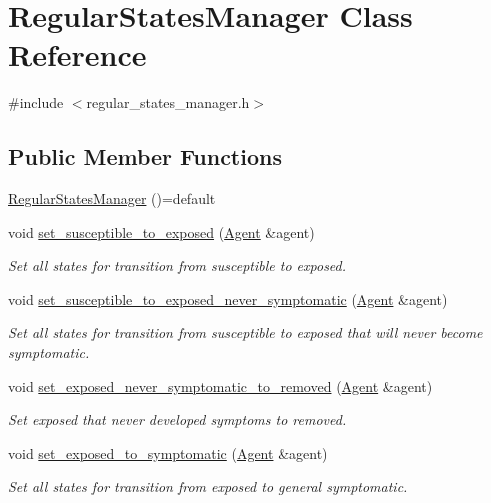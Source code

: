 \hypertarget{classRegularStatesManager}{}\section{Regular\+States\+Manager Class Reference}
\label{classRegularStatesManager}


{\ttfamily \#include $<$regular\+\_\+states\+\_\+manager.\+h$>$}

\subsection*{Public Member Functions}
\begin{DoxyCompactItemize}
\item 
\hyperlink{classRegularStatesManager_a05c6533bf5e460afef3e89d75413a510}{Regular\+States\+Manager} ()=default
\item 
void \hyperlink{classRegularStatesManager_a123ac58f69fd27b51fbb6068755b61aa}{set\+\_\+susceptible\+\_\+to\+\_\+exposed} (\hyperlink{classAgent}{Agent} \&agent)
\begin{DoxyCompactList}\small\item\em Set all states for transition from susceptible to exposed. \end{DoxyCompactList}\item 
void \hyperlink{classRegularStatesManager_a3a1ad21ed23f705b9d35ab1b5ed74d06}{set\+\_\+susceptible\+\_\+to\+\_\+exposed\+\_\+never\+\_\+symptomatic} (\hyperlink{classAgent}{Agent} \&agent)
\begin{DoxyCompactList}\small\item\em Set all states for transition from susceptible to exposed that will never become symptomatic. \end{DoxyCompactList}\item 
void \hyperlink{classRegularStatesManager_a1378bb9ee86f261d5bf7c66c7798e1b4}{set\+\_\+exposed\+\_\+never\+\_\+symptomatic\+\_\+to\+\_\+removed} (\hyperlink{classAgent}{Agent} \&agent)
\begin{DoxyCompactList}\small\item\em Set exposed that never developed symptoms to removed. \end{DoxyCompactList}\item 
void \hyperlink{classRegularStatesManager_a943fe599632b05929f56353471423955}{set\+\_\+exposed\+\_\+to\+\_\+symptomatic} (\hyperlink{classAgent}{Agent} \&agent)
\begin{DoxyCompactList}\small\item\em Set all states for transition from exposed to general symptomatic. \end{DoxyCompactList}\item 

\end{DoxyCompactItemize}
